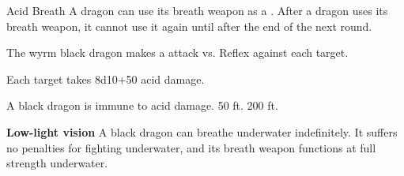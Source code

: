     \begin{freeability}{Acid Breath}
      A dragon can use its breath weapon as a .
      After a dragon uses its breath weapon, it cannot use it again until after the end of the next round.
      \par The wyrm black dragon makes a  attack
        vs. Reflex against each target.
    
    \hit Each target takes 8d10+50 acid damage.
    \end{freeability}
  
      
       A black dragon is immune to acid damage.
     50 ft.
     200 ft.
    \par\noindent\textbf{Low-light vision}
        A black dragon can breathe underwater indefinitely.
        It suffers no penalties for fighting underwater, and its breath weapon functions at full strength underwater.
  

